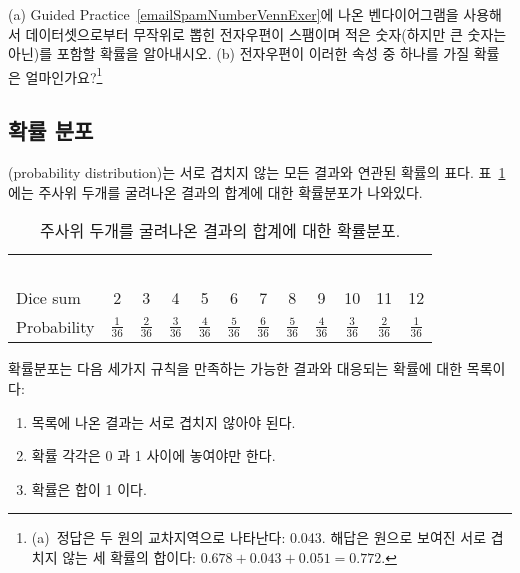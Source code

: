 \begin{exercise}
(a) Guided Practice~\ref{emailSpamNumberVennExer}에 나온 벤다이어그램을 사용해서  데이터셋으로부터 무작위로 뽑힌 전자우편이 스팸이며 적은 숫자(하지만 큰 숫자는 아닌)를 포함할 확률을 알아내시오. (b) 전자우편이 이러한 속성 중 하나를 가질 확률은 얼마인가요?\footnote{
(a)~정답은 두 원의 교차지역으로 나타난다: 0.043. 해답은 원으로 보여진 서로 겹치지 않는 세 확률의 합이다: $0.678 + 0.043 + 0.051 = 0.772$.}
\end{exercise}


\subsection{확률 분포}

(probability distribution)는 서로 겹치지 않는 모든 결과와 연관된 확률의 표다. 표~\ref{diceProb}에는 주사위 두개를 굴려나온 결과의 합계에 대한 확률분포가 나와있다.

\begin{table}[h] \small
\centering
\begin{tabular}{l ccc ccc ccc cc}
  \hline
  \ \vspace{-3mm} \\
Dice sum\vspace{0.3mm} & 2 & 3 & 4 & 5 & 6 & 7 & 8 & 9 & 10 & 11 & 12  \\
Probability & $\frac{1}{36}$ & $\frac{2}{36}$ & $\frac{3}{36}$ & $\frac{4}{36}$ & $\frac{5}{36}$ & $\frac{6}{36}$ & $\frac{5}{36}$ & $\frac{4}{36}$ & $\frac{3}{36}$ & $\frac{2}{36}$ & $\frac{1}{36}$\vspace{1mm} \\
   \hline
\end{tabular}
\caption{주사위 두개를 굴려나온 결과의 합계에 대한 확률분포.}
\label{diceProb}
\end{table}

\begin{termBox}{
확률분포는 다음 세가지 규칙을 만족하는 가능한 결과와 대응되는 확률에 대한 목록이다: \vspace{-2mm}
\begin{enumerate}
\setlength{\itemsep}{0mm}
\item 목록에 나온 결과는 서로 겹치지 않아야 된다.
\item 확률 각각은 0 과 1 사이에 놓여야만 한다.
\item 확률은 합이 1 이다. \vspace{1mm}
\end{enumerate}}
\end{termBox}

